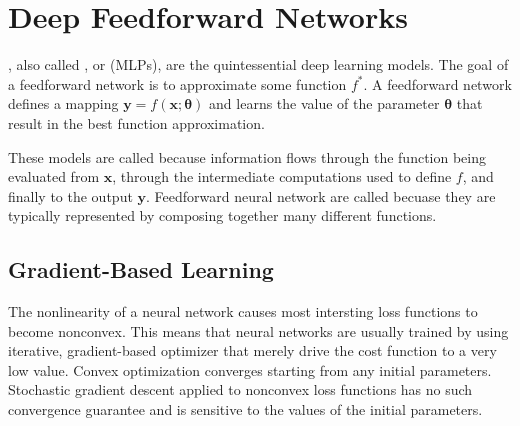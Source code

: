 
\chapter{Deep Feedforward Networks}

, also called , or  (MLPs), are the quintessential deep learning models.
The goal of a feedforward network is to approximate some function $f^{*}$.
A feedforward network defines a mapping $\bm{y} = f(\bm{x};\bm{\theta})$ and learns the value of the parameter $\bm{\theta}$ that result in the best function approximation.


These models are called  because information flows through the function being evaluated from $\bm{x}$, through the intermediate computations used to define $f$, and finally to the output $\bm{y}$.
Feedforward neural network are called  becuase they are typically represented by composing together many different functions.


\section{Gradient-Based Learning}

The nonlinearity of a neural network causes most intersting loss functions to become nonconvex.
This means that neural networks are usually trained by using iterative, gradient-based optimizer that merely drive the cost function to a very low value.
Convex optimization converges starting from any initial parameters.
Stochastic gradient descent applied to nonconvex loss functions has no such convergence guarantee and is sensitive to the values of the initial parameters.


